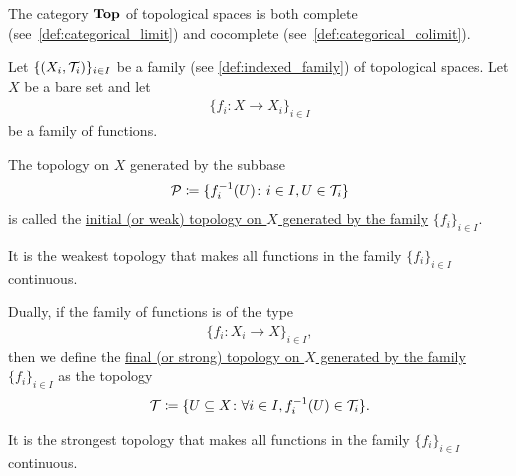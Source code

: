 \begin{theorem}
  The category $\operatorname{\mathbf{Top}}$ of topological spaces is both complete (see~\cref{def:categorical_limit}) and cocomplete (see~\cref{def:categorical_colimit}).
\end{theorem}

\begin{definition}\label{def:initial_topology}\cite{nLab:top}
  Let $\{ (X_i, \mathcal T_i) \}_{i \in I}$ be a family (see \cref{def:indexed_family}) of topological spaces. Let $X$ be a bare set and let
  \begin{align*}
    \{ f_i: X \to X_i \}_{i \in I}
  \end{align*}
  be a family of functions.

  The topology on $X$ generated by the subbase
  \begin{align*}
    \mathcal P \coloneqq \{ f_i^{-1}(U) \colon i \in I, U \in \mathcal T_i \}
  \end{align*}
  is called the \uline{initial (or weak) topology on $X$ generated by the family} $\{ f_i \}_{i \in I}$.

  It is the weakest topology that makes all functions in the family $\{ f_i \}_{i \in I}$ continuous.
\end{definition}

\begin{definition}\label{def:final_topology}\cite{nLab:top}
  Dually, if the family of functions is of the type
  \begin{align*}
    \{ f_i: X_i \to X \}_{i \in I},
  \end{align*}
  then we define the \uline{final (or strong) topology on $X$ generated by the family} $\{ f_i \}_{i \in I}$ as the topology
  \begin{align*}
    \mathcal T \coloneqq \{ U \subseteq X \colon \forall i \in I, f_i^{-1}(U) \in \mathcal T_i \}.
  \end{align*}

  It is the strongest topology that makes all functions in the family $\{ f_i \}_{i \in I}$ continuous.
\end{definition}

